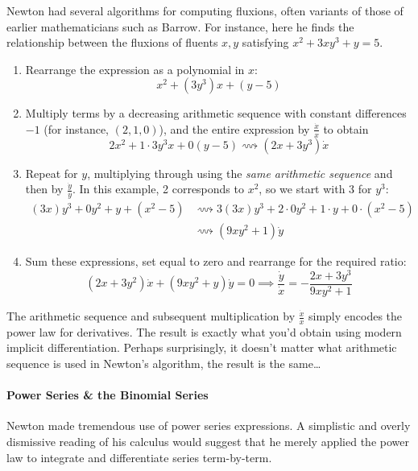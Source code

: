 Newton had several algorithms for computing fluxions, often variants of those of earlier mathematicians such as Barrow. For instance, here he finds the relationship between the fluxions of fluents $x,y$ satisfying $x^2+3xy^3+y=5$.
\begin{enumerate}
  \item Rearrange the expression as a polynomial in $x$:
  \[
  	x^2+(3y^3)x+(y-5)
  \]
  \item Multiply terms by a decreasing arithmetic sequence with constant differences $-1$ (for instance, $(2,1,0)$), and the entire expression by $\frac{\dot x}x$ to obtain
  \[
  	2x^2+1\cdot 3y^3x+0(y-5) \longrightsquigarrow (2x+3y^3)\dot x
  \] 
  \item Repeat for $y$, multiplying through using the \emph{same arithmetic sequence} and then by $\frac{\dot y}y$. In this example, 2 corresponds to $x^2$, so we start with 3 for $y^3$:
  \begin{align*}
  	(3x)y^3+0y^2+y+(x^2-5)
  	&\longrightsquigarrow 3(3x)y^3+2\cdot 0y^2+1\cdot y+0\cdot(x^2-5)\\
  	&\longrightsquigarrow (9xy^2+1)\dot y
  \end{align*}
  \item Sum these expressions, set equal to zero and rearrange for the required ratio:
  \[
  	(2x+3y^2)\dot x+(9xy^2+y)\dot y=0 \implies \frac{\dot y}{\dot x} = -\frac{2x+3y^3}{9xy^2+1}
  \]
\end{enumerate}
The arithmetic sequence and subsequent multiplication by $\frac{\dot x}{x}$ simply encodes the power law for derivatives. The result is exactly what you'd obtain using modern implicit differentiation. Perhaps surprisingly, it doesn't matter what arithmetic sequence is used in Newton's algorithm, the result is the same\ldots


\pagebreak[3]


\paragraph{Power Series \& the Binomial Series}

Newton made tremendous use of power series expressions. A simplistic and overly dismissive reading of his calculus would suggest that he merely applied the power law to integrate and differentiate series term-by-term.
\medbreak

